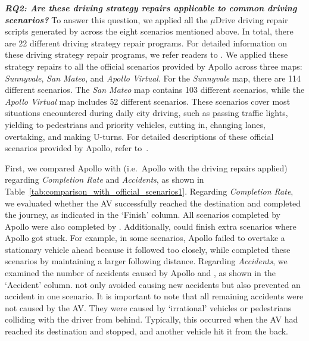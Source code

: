 \noindent \emph{\textbf {RQ2: Are these driving strategy repairs applicable to common driving scenarios?}}
To answer this question, we applied all the $\mu$Drive driving repair scripts generated by \coolname across the eight scenarios mentioned above. In total, there are 22 different driving strategy repair programs. 
For detailed information on these driving strategy repair programs, we refer readers to \cite{source_code}.
We applied these strategy repairs to all the official scenarios provided by Apollo across three maps: \emph{Sunnyvale}, \emph{San Mateo}, and \emph{Apollo Virtual}.
For the \emph{Sunnyvale} map, there are 114 different scenarios. The \emph{San Mateo} map contains 103 different scenarios, while the \emph{Apollo Virtual} map includes 52 different scenarios. These scenarios cover most situations encountered during daily city driving, such as passing traffic lights, yielding to pedestrians and priority vehicles, cutting in, changing lanes, overtaking, and making U-turns. For detailed descriptions of these official scenarios provided by Apollo, refer to~\cite{Apollostudio}. 

First, we compared Apollo with \coolname (i.e.~Apollo with the driving repairs applied) regarding \emph{Completion Rate} and \emph{Accidents}, as shown in Table~\ref{tab:comparison_with_official_scenarios1}.  Regarding \emph{Completion Rate}, we evaluated whether the AV successfully reached the destination and completed the journey, as indicated in the `Finish' column. All scenarios completed by Apollo were also completed by \coolname. Additionally, \coolname could finish extra scenarios where Apollo got stuck. For example, in some scenarios, Apollo failed to overtake a stationary vehicle ahead because it followed too closely, while \coolname completed these scenarios by maintaining a larger following distance. Regarding \emph{Accidents}, we examined the number of accidents caused by Apollo and \coolname, as shown in the `Accident' column. \coolname not only avoided causing new accidents but also prevented an accident in one scenario. It is important to note that all remaining accidents were not caused by the AV. They were caused by `irrational' vehicles or pedestrians colliding with the driver from behind. Typically, this occurred when the AV had reached its destination and stopped, and another vehicle hit it from the back.




